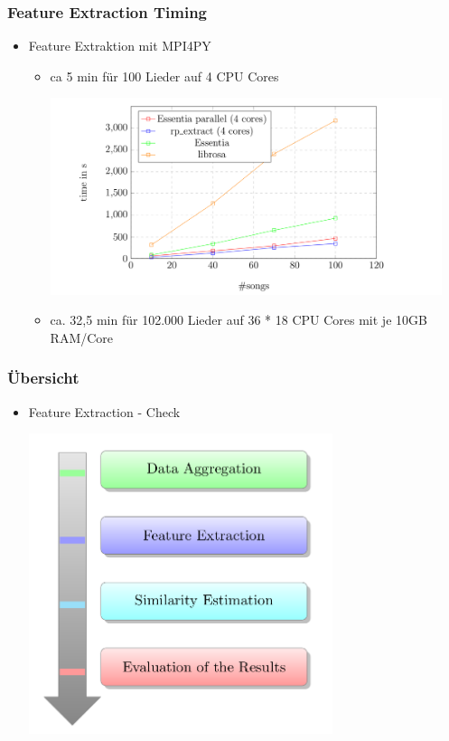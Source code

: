 \documentclass[12pt]{FSUBeamer_official}
\begin{document}
\begin{frame}
\begin{itemize}
\begin{figure}[ht]
\begin{minipage}[b]{0.375\linewidth}
			\end{minipage}
		\end{figure}
	\end{itemize}
\end{frame}

\begin{frame}
	\frametitle{Feature Extraction Timing}
	\begin{itemize}
		\item Feature Extraktion mit MPI4PY
		\begin{itemize}
			\item ca 5 min für 100 Lieder auf 4 CPU Cores 
			\begin{minipage}[b]{0.85\linewidth}
				\centering
				\includegraphics[width=0.95\textwidth]{pics/SparkFeat/featex.png}	
			\end{minipage}
			\item ca. 32,5 min für 102.000 Lieder auf 36 * 18 CPU Cores mit je 10GB RAM/Core
		\end{itemize}
	\end{itemize}
\end{frame}

\begin{frame}
	\frametitle{Übersicht}
	\begin{itemize}
		\item Feature Extraction - Check\\
		\begin{minipage}[b]{0.85\linewidth}
			\centering
			\includegraphics[width=0.7\textwidth]{pics/Org/Tasks.png}	
		\end{minipage}
	\end{itemize}
\end{frame}
\end{document}
